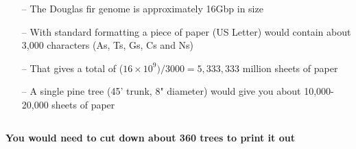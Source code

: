 \documentclass{beamer}
\begin{document}
\begin{frame}
\begin{columns}
\begin{column}{0.6\textwidth}
			\centering \small 
			\begin{itemize}

		\item[--] The Douglas fir genome is approximately 16Gbp in size
		\item[--] With standard formatting a piece of paper (US Letter) would contain about 3,000 characters (As, Ts, Gs, Cs and Ns)

		\item[--] That gives a total of ($16 \times 10^9)/3000 = 5,333,333$ million sheets of paper
		\item[--] A single pine tree (45' trunk, 8" diameter) would give you about 10,000-20,000 sheets of paper
		\end{itemize}
			
		\end{column}
	\end{columns}
	\vspace{5pt}\pause
	\textbf{You would need to cut down about 360 trees to print it out}
	
\end{frame}

	
	
\end{document}
